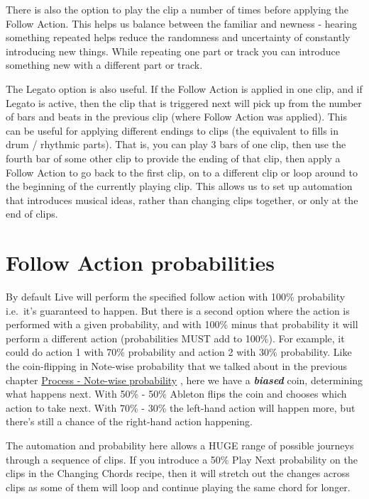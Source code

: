 \documentclass[
  12pt,
  letterpaper,
  oneside,
  open=any]{scrbook}
\begin{document}
There is also the option to play the clip a number of times before
applying the Follow Action. This helps us balance between the familiar
and newness - hearing something repeated helps reduce the randomness and
uncertainty of constantly introducing new things. While repeating one
part or track you can introduce something new with a different part or
track.

The Legato option is also useful. If the Follow Action is applied in one
clip, and if Legato is active, then the clip that is triggered next will
pick up from the number of bars and beats in the previous clip (where
Follow Action was applied). This can be useful for applying different
endings to clips (the equivalent to fills in drum / rhythmic parts).
That is, you can play 3 bars of one clip, then use the fourth bar of
some other clip to provide the ending of that clip, then apply a Follow
Action to go back to the first clip, on to a different clip or loop
around to the beginning of the currently playing clip. This allows us to
set up automation that introduces musical ideas, rather than changing
clips together, or only at the end of clips.

\section{Follow Action probabilities}\label{follow-action-probabilities}

By default Live will perform the specified follow action with 100\%
probability i.e.~it's guaranteed to happen. But there is a second option
where the action is performed with a given probability, and with 100\%
minus that probability it will perform a different action (probabilities
MUST add to 100\%). For example, it could do action 1 with 70\%
probability and action 2 with 30\% probability. Like the coin-flipping
in Note-wise probability that we talked about in the previous chapter
\hyperref[Chapter-002-Process-Note_wise_probability]{Process - Note-wise
probability} , here we have a \textbf{\emph{biased}} coin, determining
what happens next. With 50\% - 50\% Ableton flips the coin and chooses
which action to take next. With 70\% - 30\% the left-hand action will
happen more, but there's still a chance of the right-hand action
happening.

The automation and probability here allows a HUGE range of possible
journeys through a sequence of clips. If you introduce a 50\% Play Next
probability on the clips in the Changing Chords recipe, then it will
stretch out the changes across clips as some of them will loop and
continue playing the same chord for longer.
\end{document}
